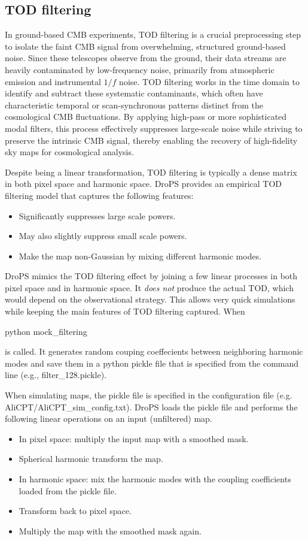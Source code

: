 \documentclass[12pt, a4paper]{ctexart} %
\def\tbox#1{\begin{tcolorbox}#1\end{tcolorbox}}
\begin{document}
\subsection{TOD filtering}

In ground-based CMB experiments, TOD filtering is a crucial preprocessing step to isolate the faint CMB signal from overwhelming, structured ground-based noise. Since these telescopes observe from the ground, their data streams are heavily contaminated by low-frequency noise, primarily from atmospheric emission and instrumental $1/f$ noise. TOD filtering works in the time domain to identify and subtract these systematic contaminants, which often have characteristic temporal or scan-synchronous patterns distinct from the cosmological CMB fluctuations. By applying high-pass or more sophisticated modal filters, this process effectively suppresses large-scale noise while striving to preserve the intrinsic CMB signal, thereby enabling the recovery of high-fidelity sky maps for cosmological analysis.

Despite being a linear transformation, TOD filtering is typically a dense matrix in both pixel space and harmonic space. DroPS provides an empirical TOD filtering model that captures the following features:
\begin{itemize}
  \item{Significantly suppresses large scale powers.}
  \item{May also slightly suppress small scale powers.}
  \item{Make the map non-Gaussian by mixing different harmonic modes.}      
\end{itemize}
DroPS mimics the TOD filtering effect by joining a few linear processes in both pixel space and in harmonic space. It {\it does not} produce the actual TOD, which would depend on the observational strategy. This allows very quick simulations while keeping the main features of TOD filtering captured.
When
\tbox{python mock\_filtering}
is called. It generates random couping coeffecients between neighboring harmonic modes and save them in a python pickle file that is specified from the command line (e.g., filter\_128.pickle).

When simulating maps, the pickle file is specified in the configuration file (e.g. AliCPT/AliCPT\_sim\_config.txt). DroPS loads the pickle file and performs the following linear operations on an input (unfiltered) map.
\begin{itemize}
\item{In pixel space: multiply the input map with a smoothed mask.}
\item{Spherical harmonic transform the map.}  
\item{In harmonic space: mix the harmonic modes with the coupling coefficients loaded from the pickle file.}
\item{Transform back to pixel space.}
\item{Multiply the map with the smoothed mask again.}
\end{itemize}
\end{document}
